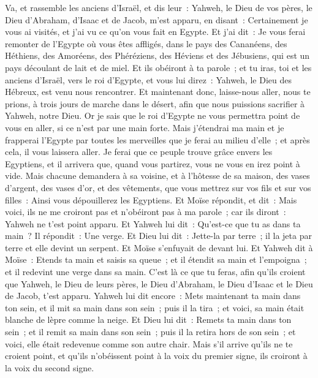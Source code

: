 \begin{multicols}{2}
Va, et rassemble les anciens d'Israël, et dis leur~: Yahweh, le Dieu de vos pères, le Dieu d'Abraham, d'Isaac et de Jacob, m'est apparu, en disant~: Certainement je vous ai visités, et j'ai vu ce qu'on vous fait en Egypte.
Et j'ai dit~: Je vous ferai remonter de l'Egypte où vous êtes affligés, dans le pays des Cananéens, des Héthiens, des Amoréens, des Phéréziens, des Héviens et des Jébusiens, qui est un pays découlant de lait et de miel.
Et ils obéiront à ta parole~; et tu iras, toi et les anciens d'Israël, vers le roi d'Egypte, et vous lui direz~: Yahweh, le Dieu des Hébreux, est venu nous rencontrer. Et maintenant donc, laisse-nous aller, nous te prions, à trois jours de marche dans le désert, afin que nous puissions sacrifier à Yahweh, notre Dieu.
Or je sais que le roi d'Egypte ne vous permettra point de vous en aller, si ce n'est par une main forte.
Mais j'étendrai ma main et je frapperai l'Egypte par toutes les merveilles que je ferai au milieu d'elle~; et après cela, il vous laissera aller.
Je ferai que ce peuple trouve grâce envers les Egyptiens, et il arrivera que, quand vous partirez, vous ne vous en irez point à vide.
Mais chacune demandera à sa voisine, et à l'hôtesse de sa maison, des vases d'argent, des vases d'or, et des vêtements, que vous mettrez sur vos fils et sur vos filles~: Ainsi vous dépouillerez les Egyptiens.
\VerseOne{}Et Moïse répondit, et dit~: Mais voici, ils ne me croiront pas et n'obéiront pas à ma parole~; car ils diront~: Yahweh ne t'est point apparu.
Et Yahweh lui dit~: Qu'est-ce que tu as dans ta main~? Il répondit~: Une verge.
Et Dieu lui dit~: Jette-la par terre~; il la jeta par terre et elle devint un serpent. Et Moïse s'enfuyait de devant lui.
Et Yahweh dit à Moïse~: Etends ta main et saisis sa queue~; et il étendit sa main et l'empoigna~; et il redevint une verge dans sa main.
C'est là ce que tu feras, afin qu'ils croient que Yahweh, le Dieu de leurs pères, le Dieu d'Abraham, le Dieu d'Isaac et le Dieu de Jacob, t'est apparu.
Yahweh lui dit encore~: Mets maintenant ta main dans ton sein, et il mit sa main dans son sein~; puis il la tira~; et voici, sa main était blanche de lèpre comme la neige.
Et Dieu lui dit~: Remets ta main dans ton sein~; et il remit sa main dans son sein~; puis il la retira hors de son sein~; et voici, elle était redevenue comme son autre chair.
Mais s'il arrive qu'ils ne te croient point, et qu'ils n'obéissent point à la voix du premier signe, ils croiront à la voix du second signe.

\end{multicols}
